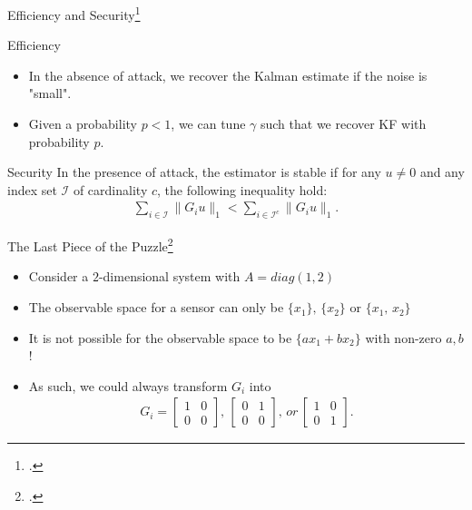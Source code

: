 \documentclass[10pt]{beamer}
\begin{document}
\begin{frame}{Efficiency and Security\footcite{Liu2017}}
  \begin{block}{Efficiency}
    \begin{itemize}
      \item In the absence of attack, we recover the Kalman estimate if the noise is "small".
      \item Given a probability $p<1$, we can tune $\gamma$ such that we recover KF with probability $p$.
    \end{itemize}
  \end{block}
  \begin{block}{Security}
    In the presence of attack, the estimator is stable if for any $u\neq 0$ and any index set $\mathcal I$ of cardinality $c$, the following inequality hold:
    \begin{align*}
      \sum_{i\in \mathcal I} \|G_iu\|_1 < \sum_{i\in \mathcal I^c} \|G_iu\|_1. 
    \end{align*}
  \end{block}
\end{frame}

\begin{frame}{The Last Piece of the Puzzle\footcite{Mao2019}}
  \begin{itemize}
    \item Consider a $2$-dimensional system with $A = diag(1,2)$ 
    \item The observable space for a sensor can only be $\{x_1\},\,\{x_2\}$ or $\{x_1,\,x_2\}$
    \item It is not possible for the observable space to be $\{ax_1+bx_2\}$ with non-zero $a,b$!
    \item As such, we could always transform $G_i$ into
      \begin{align*}
	G_i = \begin{bmatrix}
	  1&0\\
	  0&0
	  \end{bmatrix} ,\,\begin{bmatrix}
	  0&1\\
	  0&0
	  \end{bmatrix} ,\,or\,\begin{bmatrix}
	  1&0\\
	  0&1
	\end{bmatrix} .
      \end{align*}
  \end{itemize}
\end{frame}
\end{document}
